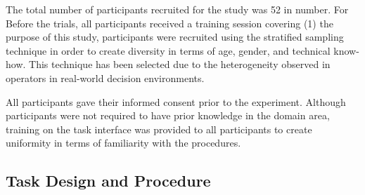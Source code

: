 \documentclass[journal]{IEEEtran}
\theoremstyle{plain}
\theoremstyle{definition}
\providecommand{\DIFaddtex}[1]{{\protect\color{blue} \sf #1}} %
\providecommand{\DIFdeltex}[1]{{\protect\color{red} \scriptsize #1}} %
\providecommand{\DIFaddbegin}{} %
\providecommand{\DIFaddend}{} %
\providecommand{\DIFdelbegin}{} %
\providecommand{\DIFdelend}{} %
\providecommand{\DIFadd}[1]{\texorpdfstring{\DIFaddtex{#1}}{#1}} %
\providecommand{\DIFdel}[1]{\texorpdfstring{\DIFdeltex{#1}}{}} %
\newcommand{\DIFscaledelfig}{0.5}
\newlength{\DIFdelgraphicswidth} %
\newlength{\DIFdelgraphicsheight} %
\newcommand{\DIFaddincludegraphics}[2][]{{\color{blue}\fbox{\DIFOincludegraphics[#1]{#2}}}} %
\newcommand{\DIFdelincludegraphics}[2][]{%
\sbox{\DIFdelgraphicsbox}{\DIFOincludegraphics[#1]{#2}}%
\settoboxwidth{\DIFdelgraphicswidth}{\DIFdelgraphicsbox} %
\settoboxtotalheight{\DIFdelgraphicsheight}{\DIFdelgraphicsbox} %
\scalebox{\DIFscaledelfig}{%
\parbox[b]{\DIFdelgraphicswidth}{\usebox{\DIFdelgraphicsbox}\\[-\baselineskip] \rule{\DIFdelgraphicswidth}{0em}}\llap{\resizebox{\DIFdelgraphicswidth}{\DIFdelgraphicsheight}{%
\setlength{\unitlength}{\DIFdelgraphicswidth}%
\begin{picture}(1,1)%
\thicklines\linethickness{2pt} %
{\color[rgb]{1,0,0}\put(0,0){\framebox(1,1){}}}%
{\color[rgb]{1,0,0}\put(0,0){\line( 1,1){1}}}%
{\color[rgb]{1,0,0}\put(0,1){\line(1,-1){1}}}%
\end{picture}%
}\hspace*{3pt}}} %
} %
\DeclareRobustCommand{\DIFaddbegin}{\DIFOaddbegin \let\includegraphics\DIFaddincludegraphics} %
\DeclareRobustCommand{\DIFaddend}{\DIFOaddend \let\includegraphics\DIFOincludegraphics} %
\DeclareRobustCommand{\DIFdelbegin}{\DIFOdelbegin \let\includegraphics\DIFdelincludegraphics} %
\DeclareRobustCommand{\DIFdelend}{\DIFOaddend \let\includegraphics\DIFOincludegraphics} %
\begin{document}





\DIFdel{The total number of participants recruited for the study was 52 in number. For }\DIFdelend \DIFaddbegin \DIFadd{Before the trials, all participants received a training session covering (1) }\DIFaddend the purpose of \DIFdelbegin \DIFdel{this study, participants were recruited using the stratified sampling technique in order to create diversity in terms of age, gender, and technical know-how. This technique has been selected due to the heterogeneity observed in operators in real-world decision environments.
}%

\DIFdel{All participants gave their informed consent prior to the experiment. Although participants were not required to have prior knowledge in the domain area, training on the task interface was provided to all participants to create uniformity in terms of familiarity with the procedures. }%

\subsection{\DIFdel{Task Design and Procedure}}
\addtocounter{subsection}{-1}%
\end{document}
